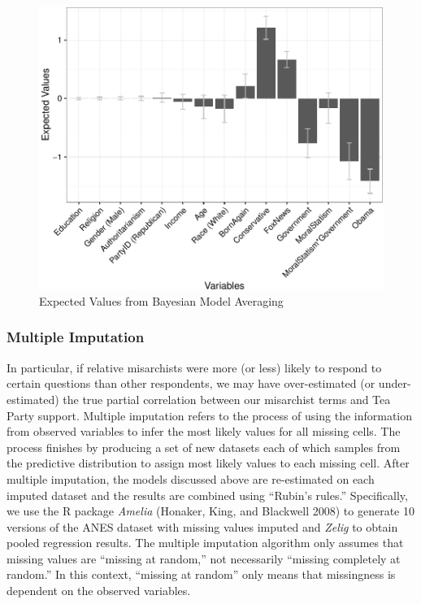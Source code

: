 \documentclass[12pt,]{article}
\begin{document}
\begin{figure}[htbp]
\centering
\includegraphics{figures/bma3-1.pdf}
\caption{Expected Values from Bayesian Model Averaging}
\end{figure}

\clearpage

\subsubsection{Multiple Imputation}\label{multiple-imputation}

In particular, if relative misarchists were more (or less) likely to
respond to certain questions than other respondents, we may have
over-estimated (or under-estimated) the true partial correlation between
our misarchist terms and Tea Party support. Multiple imputation refers
to the process of using the information from observed variables to infer
the most likely values for all missing cells. The process finishes by
producing a set of new datasets each of which samples from the
predictive distribution to assign most likely values to each missing
cell. After multiple imputation, the models discussed above are
re-estimated on each imputed dataset and the results are combined using
``Rubin's rules.'' Specifically, we use the R package \emph{Amelia}
(Honaker, King, and Blackwell 2008) to generate 10 versions of the ANES
dataset with missing values imputed and \emph{Zelig} to obtain pooled
regression results. The multiple imputation algorithm only assumes that
missing values are ``missing at random,'' not necessarily ``missing
completely at random.'' In this context, ``missing at random'' only
means that missingness is dependent on the observed variables.
\end{document}
